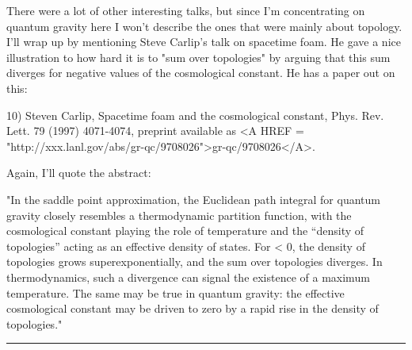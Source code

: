 There were a lot of other interesting talks, but since I'm concentrating
on quantum gravity here I won't describe the ones that were mainly about
topology.  I'll wrap up by mentioning Steve Carlip's talk on spacetime
foam.  He gave a nice illustration to how hard it is to "sum over
topologies" by arguing that this sum diverges for negative values of the
cosmological constant.  He has a paper out on this:

10) Steven Carlip, Spacetime foam and the cosmological constant,
Phys. Rev. Lett. 79 (1997) 4071-4074, preprint available as 
<A HREF = "http://xxx.lanl.gov/abs/gr-qc/9708026">gr-qc/9708026</A>.

Again, I'll quote the abstract:

"In the saddle point approximation, the Euclidean path integral for
quantum gravity closely resembles a thermodynamic partition function,
with the cosmological constant \Lambda  playing the role of temperature
and the ``density of topologies'' acting as an effective density of
states. For \Lambda  < 0, the density of topologies grows
superexponentially, and the sum over topologies diverges. In
thermodynamics, such a divergence can signal the existence of a maximum
temperature. The same may be true in quantum gravity: the effective
cosmological constant may be driven to zero by a rapid rise in the
density of topologies."








 \par\noindent\rule{\textwidth}{0.4pt}


